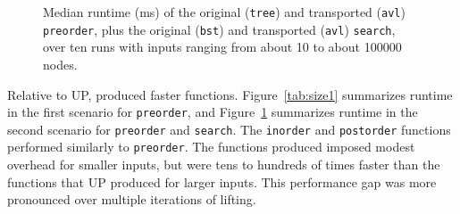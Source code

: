 \begin{figure}
\small
{}
\vspace{-0.25cm}
\caption{Median runtime (ms) of the original (\lstinline{tree}) and transported (\lstinline{avl}) \lstinline{preorder},
plus the original (\lstinline{bst}) and transported (\lstinline{avl}) \lstinline{search}, over ten runs with inputs ranging from about 10 to about 100000 nodes.}
\label{tab:size2}
\end{figure}

Relative to UP, \toolnamec produced faster functions.
Figure~\ref{tab:size1} summarizes
runtime in the first scenario for \lstinline{preorder},
and Figure~\ref{tab:size2} summarizes
runtime in the second scenario for \lstinline{preorder} and \lstinline{search}.
The \lstinline{inorder} and \lstinline{postorder} functions performed similarly to \lstinline{preorder}.
The functions \toolnamec produced imposed modest overhead for smaller inputs, but were
tens to hundreds of times faster than the functions that UP produced for larger inputs.
This performance gap was more pronounced over multiple iterations of lifting.


